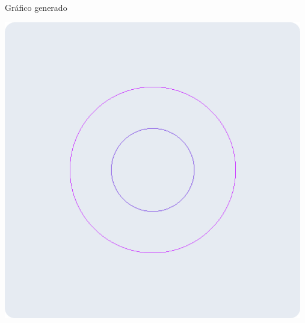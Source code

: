 \documentclass[a4paper]{article}
\begin{document}
\newpage
Gráfico generado\\
\begin{center}
\includegraphics[width=13cm]{src/4.png}
\end{center}
\end{document}

